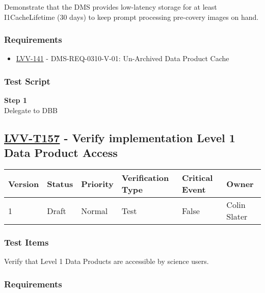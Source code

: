 Demonstrate that the DMS provides low-latency storage for at least
I1CacheLifetime (30 days) to keep prompt processing pre-covery images on
hand.

\subsubsection{Requirements}\label{requirements-23}

\begin{itemize}
\tightlist
\item
  \href{https://jira.lsstcorp.org/browse/LVV-141}{LVV-141} -
  DMS-REQ-0310-V-01: Un-Archived Data Product Cache
\end{itemize}

\subsubsection{Test Script}\label{test-script-23}

\textbf{Step 1}\\
Delegate to DBB\\[2\baselineskip]

\hypertarget{lvv-t157---verify-implementation-level-1-data-product-access}{\subsection{\texorpdfstring{\href{https://jira.lsstcorp.org/secure/Tests.jspa\#/testCase/LVV-T157}{LVV-T157}
- Verify implementation Level 1 Data Product
Access}{LVV-T157 - Verify implementation Level 1 Data Product Access}}\label{lvv-t157---verify-implementation-level-1-data-product-access}}

\begin{longtable}[]{@{}llllll@{}}
\toprule
Version & Status & Priority & Verification Type & Critical Event &
Owner\tabularnewline
\midrule
\endhead
1 & Draft & Normal & Test & False & Colin Slater\tabularnewline
\bottomrule
\end{longtable}

\subsubsection{Test Items}\label{test-items-24}

Verify that Level 1 Data Products are accessible by science users.

\subsubsection{Requirements}\label{requirements-24}

